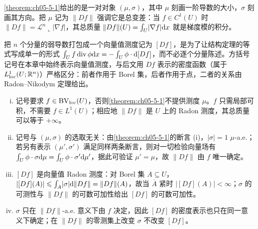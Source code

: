 \documentclass[../../main.tex]{subfiles}%
\begin{document}
\begin{remark}\label{remark:ch05-def-5-1-变差测度-动机}
\cref{theorem:ch05-5-1}给出的是一对对象 $(\mu,\sigma)$，其中 $\mu$ 刻画一阶导数的大小，$\sigma$ 刻画其方向。把 $\mu$ 记为 $\lVert Df\rVert$ 强调它是总变差：当 $f\in C^1(U)$ 时 $\lVert Df\rVert=\mathcal{L}^n\llcorner\lvert\nabla f\rvert$，其总质量 $\lVert Df\rVert(U)=\int_U\lvert\nabla f\rvert\mathrm{d} x$ 就是梯度模的积分。%

把 $n$ 个分量的弱导数打包成一个向量值测度记为 $[Df]$，是为了让结构定理的等式写成单一的形式 $\int_U f\operatorname{div}\phi\mathrm{d} x=-\int_U\phi\cdot\mathrm{d}[Df]$，而不必逐个分量陈述。方括号记号在本章中始终表示向量值测度，与后文用 $Df$ 表示的密度函数（属于 $L^1_{\mathrm{loc}}(U;\mathbb{R}^n)$）严格区分：前者作用于 Borel 集，后者作用于点，二者的关系由 Radon--Nikodym 定理给出。%
\end{remark}

\begin{remark}\label{remark:ch05-def-5-1-变差测度-条件}
\begin{enumerate}[(i)]
\item 记号要求 $f\in\mathrm{BV}_{\mathrm{loc}}(U)$，否则\cref{theorem:ch05-5-1}不提供测度 $\mu$。$f$ 只需局部可积，不需要 $f\in L^1(U)$；相应地 $\lVert Df\rVert$ 是 $U$ 上的 Radon 测度，其总质量可以等于 $+\infty$。%
\item 记号与 $(\mu,\sigma)$ 的选取无关：由\cref{theorem:ch05-5-1}的断言 (i)，$\lvert\sigma\rvert=1$ $\mu$-a.e.；若另有表示 $(\mu',\sigma')$ 满足同样两条断言，则对一切检验向量场有 $\int_U\phi\cdot\sigma\mathrm{d}\mu=\int_U\phi\cdot\sigma'\mathrm{d}\mu'$，据此可验证 $\mu'=\mu$，故 $\lVert Df\rVert$ 由 $f$ 唯一确定。 %
\item $[Df]$ 是向量值 Radon 测度：对 Borel 集 $A\subseteq U$，$\lvert[Df](A)\rvert\leqslant\int_A\lvert\sigma\rvert\mathrm{d}\lVert Df\rVert=\lVert Df\rVert(A)$，故当 $\overline{A}$ 紧时 $\lvert[Df](A)\rvert<\infty$；$\sigma$ 的可测性与 $\lVert Df\rVert$ 的可数可加性给出 $[Df]$ 的可数可加性。
\item $\sigma$ 只在 $\lVert Df\rVert$-a.e. 意义下由 $f$ 决定，因此 $[Df]$ 的密度表示也只在同一意义下确定；在 $\lVert Df\rVert$ 的零测集上改变 $\sigma$ 不改变 $[Df]$。
\end{enumerate}
\end{remark}
\end{document}
